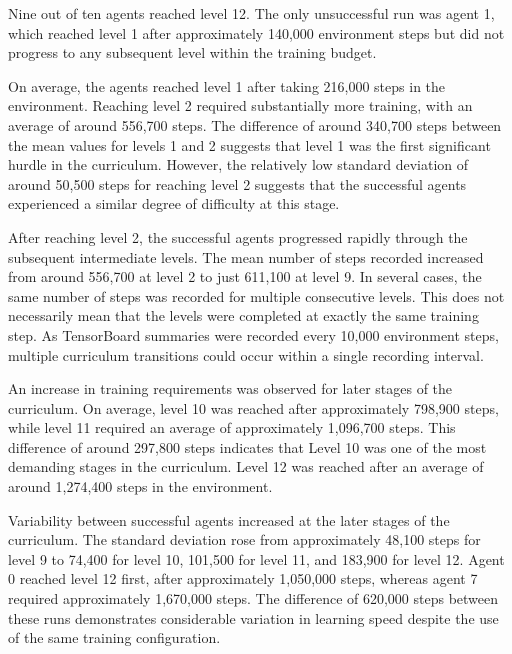 Nine out of ten agents reached level 12. The only unsuccessful run was agent 1, which reached level 1 after approximately 140,000 environment steps but did not progress to any subsequent level within the training budget.

On average, the agents reached level 1 after taking 216,000 steps in the environment. Reaching level 2 required substantially more training, with an average of around 556,700 steps. The difference of around 340,700 steps between the mean values for levels 1 and 2 suggests that level 1 was the first significant hurdle in the curriculum. However, the relatively low standard deviation of around 50,500 steps for reaching level 2 suggests that the successful agents experienced a similar degree of difficulty at this stage.

After reaching level 2, the successful agents progressed rapidly through the subsequent intermediate levels. The mean number of steps recorded increased from around 556,700 at level 2 to just 611,100 at level 9. In several cases, the same number of steps was recorded for multiple consecutive levels. This does not necessarily mean that the levels were completed at exactly the same training step. As TensorBoard summaries were recorded every 10,000 environment steps, multiple curriculum transitions could occur within a single recording interval.

An increase in training requirements was observed for later stages of the curriculum. On average, level 10 was reached after approximately 798,900 steps, while level 11 required an average of approximately 1,096,700 steps. This difference of around 297,800 steps indicates that Level 10 was one of the most demanding stages in the curriculum. Level 12 was reached after an average of around 1,274,400 steps in the environment.

Variability between successful agents increased at the later stages of the curriculum. The standard deviation rose from approximately 48,100 steps for level 9 to 74,400 for level 10, 101,500 for level 11, and 183,900 for level 12. Agent 0 reached level 12 first, after approximately 1,050,000 steps, whereas agent 7 required approximately 1,670,000 steps. The difference of 620,000 steps between these runs demonstrates considerable variation in learning speed despite the use of the same training configuration.


